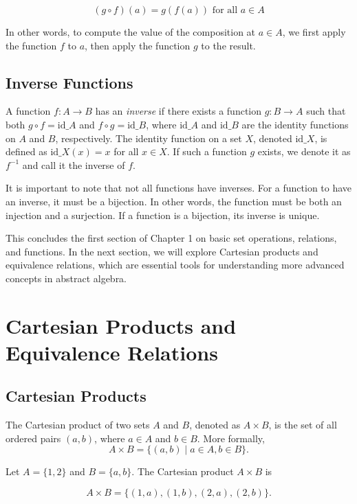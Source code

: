 \[
(g \circ f)(a) = g(f(a)) \text{ for all } a \in A
\]

In other words, to compute the value of the composition at $a \in A$, we first apply the function $f$ to $a$, then apply the function $g$ to the result.

\subsection{Inverse Functions}

A function $f : A \to B$ has an \textit{inverse} if there exists a function $g : B \to A$ such that both $g \circ f = \text{id}\_A$ and $f \circ g = \text{id}\_B$, where $\text{id}\_A$ and $\text{id}\_B$ are the identity functions on $A$ and $B$, respectively. The identity function on a set $X$, denoted $\text{id}\_X$, is defined as $\text{id}\_X(x) = x$ for all $x \in X$. If such a function $g$ exists, we denote it as $f^{-1}$ and call it the inverse of $f$.

It is important to note that not all functions have inverses. For a function to have an inverse, it must be a bijection. In other words, the function must be both an injection and a surjection. If a function is a bijection, its inverse is unique.

This concludes the first section of Chapter 1 on basic set operations, relations, and functions. In the next section, we will explore Cartesian products and equivalence relations, which are essential tools for understanding more advanced concepts in abstract algebra.


\section{Cartesian Products and Equivalence Relations}

\subsection{Cartesian Products}

The Cartesian product of two sets $A$ and $B$, denoted as $A \times B$, is the set of all ordered pairs $(a, b)$, where $a \in A$ and $b \in B$. More formally,
\[
A \times B = \{(a, b) \mid a \in A, b \in B\}.
\]

\begin{example}

Let $A = \{1, 2\}$ and $B = \{a, b\}$. The Cartesian product $A \times B$ is

\[
A \times B = \{(1, a), (1, b), (2, a), (2, b)\}.
\]

\end{example}

